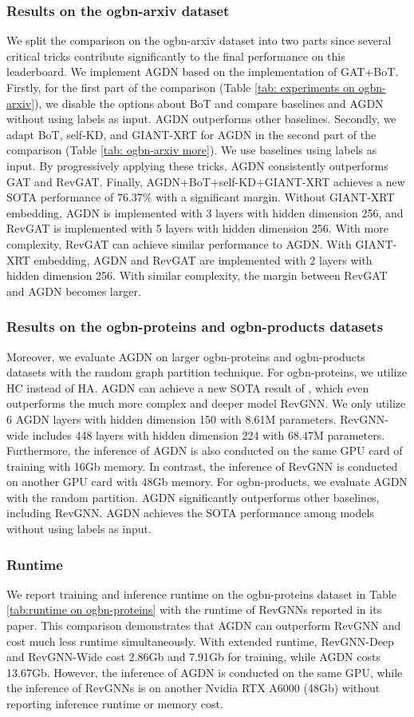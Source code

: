 \documentclass{article}
\begin{document}
\subsubsection{Results on the ogbn-arxiv dataset}
We split the comparison on the ogbn-arxiv dataset into two parts since several critical tricks contribute significantly to the final performance on this leaderboard. We implement AGDN based on the implementation of GAT+BoT. Firstly, for the first part of the comparison (Table \ref{tab: experiments on ogbn-arxiv}), we disable the options about BoT and compare baselines and AGDN without using labels as input. AGDN outperforms other baselines. Secondly, we adapt BoT, self-KD, and GIANT-XRT for AGDN in the second part of the comparison (Table \ref{tab: ogbn-arxiv more}). We use baselines using labels as input. By progressively applying these tricks, AGDN consistently outperforms GAT and RevGAT. Finally, AGDN+BoT+self-KD+GIANT-XRT achieves a new SOTA performance of 76.37\% with a significant margin. Without GIANT-XRT embedding, AGDN is implemented with 3 layers with hidden dimension 256, and RevGAT is implemented with 5 layers with hidden dimension 256. With more complexity, RevGAT can achieve similar performance to AGDN. With GIANT-XRT embedding, AGDN and RevGAT are implemented with 2 layers with hidden dimension 256. With similar complexity, the margin between RevGAT and AGDN becomes larger.


\subsubsection{Results on the ogbn-proteins and ogbn-products datasets}
Moreover, we evaluate AGDN on larger ogbn-proteins and ogbn-products datasets with the random graph partition technique. For ogbn-proteins, we utilize HC instead of HA. AGDN can achieve a new SOTA result of , which even outperforms the much more complex and deeper model RevGNN. We only utilize 6 AGDN layers with hidden dimension 150 with 8.61M parameters. RevGNN-wide includes 448 layers with hidden dimension 224 with 68.47M parameters. Furthermore, the inference of AGDN is also conducted on the same GPU card of training with 16Gb memory. In contrast, the inference of RevGNN is conducted on another GPU card with 48Gb memory. 
For ogbn-products, we evaluate AGDN with the random partition. AGDN significantly outperforms other baselines, including RevGNN. AGDN achieves the SOTA performance among models without using labels as input.  

\subsubsection{Runtime}
We report training and inference runtime on the ogbn-proteins dataset in Table \ref{tab:runtime on ogbn-proteins} with the runtime of RevGNNs reported in its paper. This comparison demonstrates that AGDN can outperform RevGNN and cost much less runtime simultaneously. With extended runtime, RevGNN-Deep and RevGNN-Wide cost 2.86Gb and 7.91Gb for training, while AGDN costs 13.67Gb. However, the inference of AGDN is conducted on the same GPU, while the inference of RevGNNs is on another Nvidia RTX A6000 (48Gb) without reporting inference runtime or memory cost.
\end{document}
